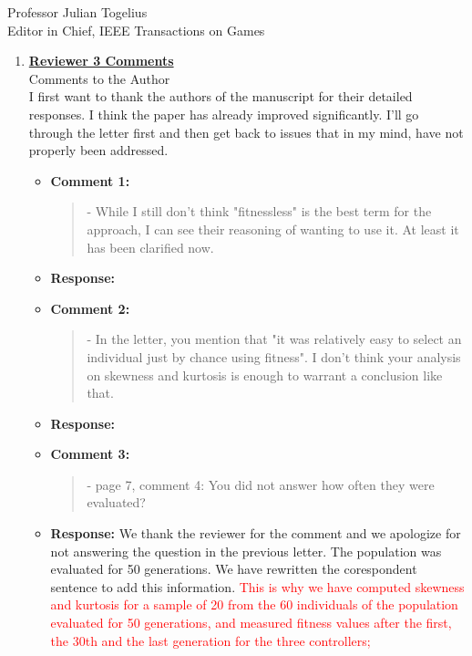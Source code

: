 \documentclass[10pt]{letter} %
\begin{document}
\begin{letter}{Professor Julian Togelius \\ Editor in Chief, IEEE Transactions on Games}
\begin{enumerate}
%
\item {\bf \underline{ Reviewer 3 Comments}}\\
		Comments to the Author\\
		I first want to thank the authors of the manuscript for their detailed responses. I think the paper has already improved significantly. I'll go through the letter first and then get back to issues that in my mind, have not properly been addressed.	
		\begin{itemize}
			\item {\bf Comment 1:}
				\begin{quote}	
					- While I still don't think "fitnessless" is the best term for the approach, I can see their reasoning of wanting to use it. At least it has been clarified now.
				\end{quote}	
			\item {\bf Response:} 
			\item {\bf Comment 2:}
				\begin{quote}	
					- In the letter, you mention that "it was relatively easy to select an individual just by chance using fitness". I don't think your analysis on skewness and kurtosis is enough to warrant a conclusion like that.
				\end{quote}	
			\item {\bf Response:} 
			\item {\bf Comment 3:}
				\begin{quote}	
					- page 7, comment 4: You did not answer how often they were evaluated?
				\end{quote}	
			\item {\bf Response:} 
			We thank the reviewer for the comment and we apologize for not answering the question in the previous letter. The population was evaluated for 50 generations. We have rewritten the corespondent sentence to add this information.
			\textcolor{red}{This is why we have computed skewness and kurtosis for a sample of 20 from the 60 individuals of the population evaluated for 50 generations, and measured fitness values after the first, the 30th and the last generation for the three controllers;}
			

\end{itemize}
\end{enumerate}
\end{letter}
\end{document}
